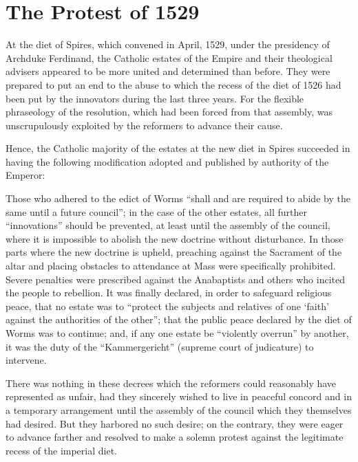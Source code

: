 \section{The Protest of 1529}

At the diet of Spires, which convened in April, 1529, under the
presidency of Archduke Ferdinand, the Catholic estates of the Empire
and their theological advisers appeared to be more united and
determined than before. They were prepared to put an end to the
abuse to which the recess of the diet of 1526 had been put by the
innovators during the last three years. For the flexible phraseology
of the resolution, which had been forced from that assembly, was
unscrupulously exploited by the reformers to advance their cause.

Hence, the Catholic majority of the estates at the new diet in
Spires succeeded in having the following modification adopted and
published by authority of the Emperor:

Those who adhered to the edict of Worms “shall and are required to
abide by the same until a future council”; in the case of the other estates,
all further “innovations” should be prevented, at least until the assembly of
the council, where it is impossible to abolish the new doctrine without
disturbance. In those parts where the new doctrine is upheld, preaching against
the Sacrament of the altar and placing obstacles to attendance at Mass were
specifically prohibited. Severe penalties were prescribed against the
Anabaptists and others who incited the people to rebellion. It was finally declared,
in order to safeguard religious peace, that no estate was to “protect
the subjects and relatives of one ‘faith’ against the authorities of the other”;
that the public peace declared by the diet of Worms was to continue; and,
if any one estate be “violently overrun” by another, it was the duty of the
“Kammergericht” (supreme court of judicature) to intervene.

There was nothing in these decrees which the reformers could
reasonably have represented as unfair, had they sincerely wished to
live in peaceful concord and in a temporary arrangement until the
assembly of the council which they themselves had desired. But they
harbored no such desire; on the contrary, they were eager to advance
farther and resolved to make a solemn protest against the legitimate
recess of the imperial diet.


